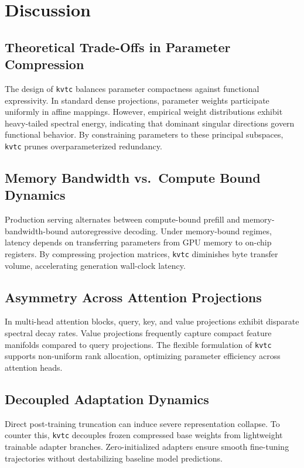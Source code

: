 \section{Discussion}

\subsection{Theoretical Trade-Offs in Parameter Compression}
The design of \texttt{kvtc} balances parameter compactness against functional expressivity. In standard dense projections, parameter weights participate uniformly in affine mappings. However, empirical weight distributions exhibit heavy-tailed spectral energy, indicating that dominant singular directions govern functional behavior. By constraining parameters to these principal subspaces, \texttt{kvtc} prunes overparameterized redundancy.

\subsection{Memory Bandwidth vs.\ Compute Bound Dynamics}
Production serving alternates between compute-bound prefill and memory-bandwidth-bound autoregressive decoding. Under memory-bound regimes, latency depends on transferring parameters from GPU memory to on-chip registers. By compressing projection matrices, \texttt{kvtc} diminishes byte transfer volume, accelerating generation wall-clock latency.

\subsection{Asymmetry Across Attention Projections}
In multi-head attention blocks, query, key, and value projections exhibit disparate spectral decay rates. Value projections frequently capture compact feature manifolds compared to query projections. The flexible formulation of \texttt{kvtc} supports non-uniform rank allocation, optimizing parameter efficiency across attention heads.

\subsection{Decoupled Adaptation Dynamics}
Direct post-training truncation can induce severe representation collapse. To counter this, \texttt{kvtc} decouples frozen compressed base weights from lightweight trainable adapter branches. Zero-initialized adapters ensure smooth fine-tuning trajectories without destabilizing baseline model predictions.

